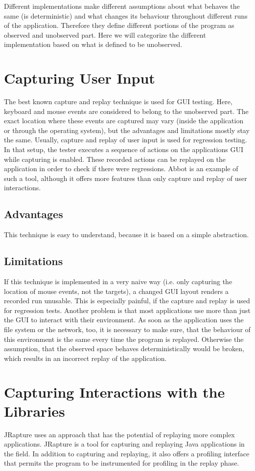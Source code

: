 Different implementations make different assumptions about what behaves the same (is deterministic) and what changes its behaviour throughout different runs of the application. Therefore they define different portions of the program as observed and unobserved part. Here we will categorize the different implementation based on what is defined to be unobserved.

\section {Capturing User Input}
The best known capture and replay technique is used for GUI testing. Here, keyboard and mouse events are considered to belong to the unobserved part. The exact location where these events are captured may vary (inside the application or through the operating system), but the advantages and limitations mostly stay the same. Usually, capture and replay of user input is used for regression testing. In that setup, the tester executes a sequence of actions on the applications GUI while capturing is enabled. These recorded actions can be replayed on the application in order to check if there were regressions. Abbot \cite{abbot} is an example of such a tool, although it offers more features than only capture and replay of user interactions.
\subsection{Advantages}
This technique is easy to understand, because it is based on a simple abstraction.
\subsection{Limitations}
If this technique is implemented in a very naive way (i.e. only capturing the location of mouse events, not the targets), a changed GUI layout renders a recorded run unusable. This is especially painful, if the capture and replay is used for regression tests. Another problem is that most applications use more than just the GUI to interact with their environment. As soon as the application uses the file system or the network, too, it is necessary to make sure, that the behaviour of this environment is the same every time the program is replayed. Otherwise the assumption, that the observed space behaves deterministically would be broken, which results in an incorrect replay of the application.

\section {Capturing Interactions with the Libraries}
JRapture \cite{jrapture} uses an approach that has the potential of replaying more complex applications. JRapture is a tool for capturing and replaying Java applications in the field. In addition to capturing and replaying, it also offers a profiling interface that permits the program to be instrumented for profiling in the replay phase.

